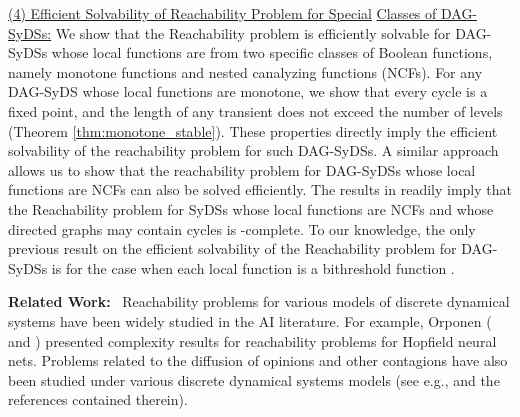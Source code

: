 \smallskip

\noindent
\underline{(4) Efficient Solvability of Reachability Problem for Special}\newline
\underline{Classes of DAG-SyDSs:} 
We show that the Reachability problem is efficiently solvable for
DAG-SyDSs whose local functions are from two specific
classes of Boolean functions, namely monotone functions and
nested canalyzing functions (NCFs).
For any DAG-SyDS whose local functions are monotone,
we show that every cycle is a fixed point, 
and the length of any transient does not exceed the number of levels
(Theorem \ref{thm:monotone_stable}).
These properties
directly imply the efficient solvability of the reachability
problem for such DAG-SyDSs.
A similar approach allows us to show that the reachability
problem for DAG-SyDSs whose local functions are NCFs can
also be solved efficiently. 
The results in \cite{Rosenkrantz-etal-2018} readily imply
that the Reachability problem for SyDSs whose local
functions are NCFs and whose directed graphs may contain cycles  
is \cpsp-complete.
To our knowledge, the only previous result on the efficient
solvability of the  Reachability problem for DAG-SyDSs is
for the case when each local function is a bithreshold
function \cite{KKM+2013}.

\iffalse
 we show
that the length of every phase space cycle is at most 2.
Moreover, if the number of levels of  \cals{} is $L$,
no transient is longer than $2L-1$
(Theorem \ref{thm:NCF_phase_space}).
These properties
directly imply the efficient solvability of the reachability
problem for such DAG-SyDSs.
\fi



\smallskip

\noindent
\textbf{Related Work:}~ Reachability problems for various
models of discrete dynamical systems have been widely studied
in the AI literature.
For example, Orponen 
(\citeyear{Orponen-1993} and \citeyear{Orponen-1994}) presented
complexity results for  reachability problems for Hopfield neural nets.
Problems related to the diffusion of opinions and other contagions have
also been studied under various discrete dynamical systems
models (see e.g., \cite{Auletta-etal-2018,Botan-etal-2019,Chistikov-etal-2020}
and the references contained therein).

